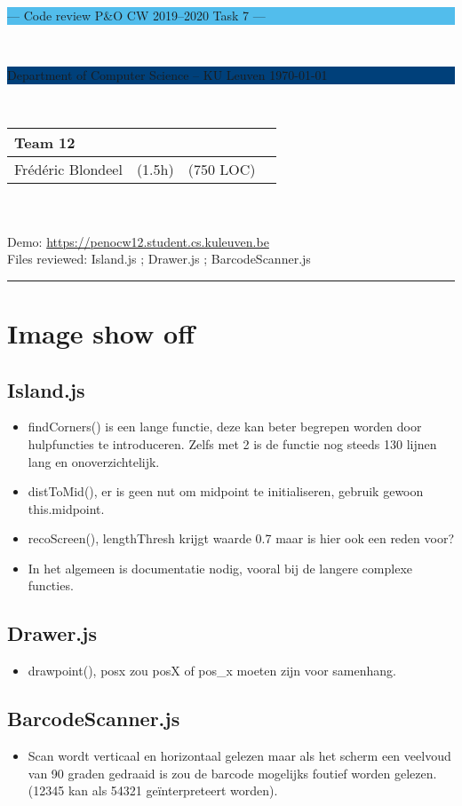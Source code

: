\documentclass[a4paper,11pt]{article}
\begin{document}
\noindent
\colorbox[HTML]{52BDEC}{\bfseries\parbox{\textwidth}{\centering\large
  --- Code review P\&O CW 2019--2020 Task 7 ---
}}
\\[-1mm]
\colorbox[HTML]{00407A}{\bfseries\color{white}\parbox{\textwidth}{
  Department of Computer Science -- KU Leuven
  \hfill
  \today
}}
\\

\smallskip

\noindent
\begin{tabular}{*4l}
\toprule
\multicolumn{3}{l}{\large\textbf{Team 12}} \\
\midrule
Frédéric Blondeel & (1.5h) &  (750 LOC) \\ %
\bottomrule
\hline
\end{tabular}\\
\\
Demo: \url{https://penocw12.student.cs.kuleuven.be} \\
Files reviewed: Island.js ; Drawer.js ; BarcodeScanner.js

\noindent
{\color[HTML]{52BDEC} \rule{\linewidth}{1mm} }

\smallskip

\section{Image show off}
\subsection{Island.js}
\begin{itemize}
\item findCorners() is een lange functie, deze kan beter begrepen worden door hulpfuncties te introduceren. Zelfs met 2 is de functie nog steeds 130 lijnen lang en onoverzichtelijk.
\item distToMid(), er is geen nut om midpoint te initialiseren, gebruik gewoon this.midpoint.
\item recoScreen(), lengthThresh krijgt waarde 0.7 maar is hier ook een reden voor?
\item In het algemeen is documentatie nodig, vooral bij de langere complexe functies.
\end{itemize}
\subsection{Drawer.js}
\begin{itemize}
\item drawpoint(), posx zou posX of pos\_x moeten zijn voor samenhang.
\end{itemize}
\subsection{BarcodeScanner.js}
\begin{itemize}
\item Scan wordt verticaal en horizontaal gelezen maar als het scherm een veelvoud van 90 graden gedraaid is zou de barcode mogelijks foutief worden gelezen. (12345 kan als 54321 geïnterpreteert worden). 
\end{itemize}
\end{document}

